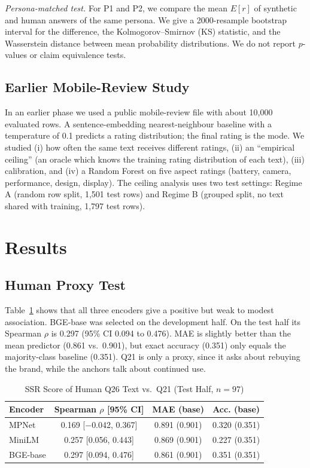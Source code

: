 \documentclass[conference]{IEEEtran}
\begin{document}
\textit{Persona-matched test.} For P1 and P2, we compare the mean $E[r]$ of synthetic and human answers of the same persona. We give a 2000-resample bootstrap interval for the difference, the Kolmogorov--Smirnov (KS) statistic, and the Wasserstein distance between mean probability distributions. We do not report $p$-values or claim equivalence tests.

\subsection{Earlier Mobile-Review Study}
In an earlier phase we used a public mobile-review file with about 10,000 evaluated rows. A sentence-embedding nearest-neighbour baseline with a temperature of 0.1 predicts a rating distribution; the final rating is the mode. We studied (i) how often the same text receives different ratings, (ii) an ``empirical ceiling'' (an oracle which knows the training rating distribution of each text), (iii) calibration, and (iv) a Random Forest on five aspect ratings (battery, camera, performance, design, display). The ceiling analysis uses two test settings: Regime A (random row split, 1,501 test rows) and Regime B (grouped split, no text shared with training, 1,797 test rows).

\section{Results}
\subsection{Human Proxy Test}
Table~\ref{tab:human} shows that all three encoders give a positive but weak to modest association. BGE-base was selected on the development half. On the test half its Spearman $\rho$ is 0.297 (95\% CI 0.094 to 0.476). MAE is slightly better than the mean predictor (0.861 vs.\ 0.901), but exact accuracy (0.351) only equals the majority-class baseline (0.351). Q21 is only a proxy, since it asks about rebuying the brand, while the anchors talk about continued use.

\begin{table}[t]
\caption{SSR Score of Human Q26 Text vs.\ Q21 (Test Half, $n=97$)}
\label{tab:human}
\centering
\small
\begin{tabular}{@{}lccc@{}}
\toprule
Encoder & Spearman $\rho$ [95\% CI] & MAE (base) & Acc. (base) \\
\midrule
MPNet & 0.169 [$-$0.042, 0.367] & 0.891 (0.901) & 0.320 (0.351) \\
MiniLM & 0.257 [0.056, 0.443] & 0.869 (0.901) & 0.227 (0.351) \\
BGE-base & 0.297 [0.094, 0.476] & 0.861 (0.901) & 0.351 (0.351) \\
\bottomrule
\end{tabular}
\end{table}
\end{document}
